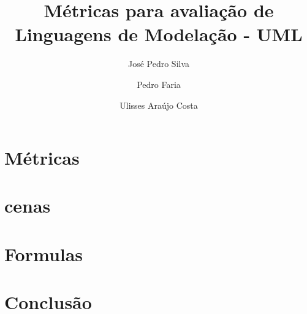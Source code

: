 \documentclass[10pt]{article}
\title{\sf  Métricas para avaliação de Linguagens de Modelação - UML}
\author{ José Pedro Silva \and Pedro Faria \and Ulisses Araújo Costa }
\date{}
\begin{document}
\maketitle


\section{Métricas}

\section{cenas}

\section{Formulas}


\section{Conclusão}

{}

\end{document}
